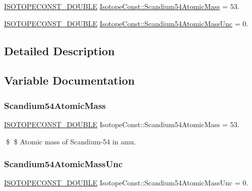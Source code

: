 \begin{DoxyCompactItemize}
\item 
\mbox{\hyperlink{group___isotope_const-_macros_ga8f45a7272ce02c0b4c65c44636ed719a}{I\+S\+O\+T\+O\+P\+E\+C\+O\+N\+S\+T\+\_\+\+D\+O\+U\+B\+LE}} \mbox{\hyperlink{group___isotope_const-_scandium-_sc54_gaa201ece3762004619c08c501295a1c98}{Isotope\+Const\+::\+Scandium54\+Atomic\+Mass}} = 53.
\item 
\mbox{\hyperlink{group___isotope_const-_macros_ga8f45a7272ce02c0b4c65c44636ed719a}{I\+S\+O\+T\+O\+P\+E\+C\+O\+N\+S\+T\+\_\+\+D\+O\+U\+B\+LE}} \mbox{\hyperlink{group___isotope_const-_scandium-_sc54_ga73ec6c58d3e835250abc5dba9273c187}{Isotope\+Const\+::\+Scandium54\+Atomic\+Mass\+Unc}} = 0.
\end{DoxyCompactItemize}


\subsection{Detailed Description}


\subsection{Variable Documentation}
\mbox{\label{group___isotope_const-_scandium-_sc54_gaa201ece3762004619c08c501295a1c98}} 
\subsubsection{\texorpdfstring{Scandium54\+Atomic\+Mass}{Scandium54AtomicMass}}
{\footnotesize\ttfamily \mbox{\hyperlink{group___isotope_const-_macros_ga8f45a7272ce02c0b4c65c44636ed719a}{I\+S\+O\+T\+O\+P\+E\+C\+O\+N\+S\+T\+\_\+\+D\+O\+U\+B\+LE}} Isotope\+Const\+::\+Scandium54\+Atomic\+Mass = 53.}

\$ \$ Atomic mass of Scandium-\/54 in amu. \mbox{\label{group___isotope_const-_scandium-_sc54_ga73ec6c58d3e835250abc5dba9273c187}} 
\subsubsection{\texorpdfstring{Scandium54\+Atomic\+Mass\+Unc}{Scandium54AtomicMassUnc}}
{\footnotesize\ttfamily \mbox{\hyperlink{group___isotope_const-_macros_ga8f45a7272ce02c0b4c65c44636ed719a}{I\+S\+O\+T\+O\+P\+E\+C\+O\+N\+S\+T\+\_\+\+D\+O\+U\+B\+LE}} Isotope\+Const\+::\+Scandium54\+Atomic\+Mass\+Unc = 0.}

